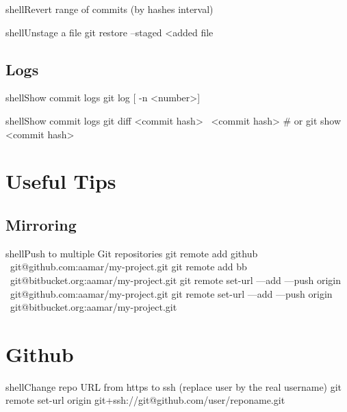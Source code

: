 \documentclass[10pt,a4paper]{article}
\begin{document}
\begin{multicols}{3}
\begin{codebox}{shell}{Revert range of commits (by hashes interval)}
\end{codebox}

\begin{codebox}{shell}{Unstage a file}
git restore --staged <added file

\end{codebox}

\subsection{Logs}

\begin{codebox}{shell}{Show commit logs}
git log [ -n <number>]

\end{codebox}

\begin{codebox}{shell}{Show commit logs}
git diff <commit hash>~   <commit hash>
# or 
 git show <commit hash>

\end{codebox}

\section{Useful Tips}

\subsection{Mirroring}

\begin{codebox}{shell}{Push to multiple Git repositories}
git remote add github \
      git@github.com:aamar/my-project.git 
git remote add bb \ 
      git@bitbucket.org:aamar/my-project.git 
git remote set-url ---add ---push origin \
      git@github.com:aamar/my-project.git
git remote set-url ---add ---push origin \
      git@bitbucket.org:aamar/my-project.git

\end{codebox}

\section{Github}

\begin{codebox}{shell}{Change repo URL from https to ssh (replace user by the real username)}
git remote set-url origin git+ssh://git@github.com/user/reponame.git

\end{codebox}


\AtNextBibliography{\footnotesize}
\printbibliography  
\end{multicols}
\end{document}
